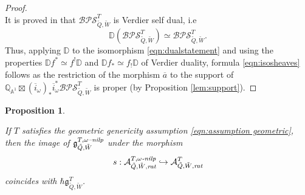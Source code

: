 \documentclass{amsart}
\newtheorem{proposition}[theorem]{Proposition}
\def\oi{\overline{i}}
\def\tQ{\tilde{Q}}
\def\tW{\tilde{W}}
\def\khrate{\mathcal{A}^{T}_{\tQ,\tW,\emph{rat}}}
\def\kharate{\mathcal{A}^{T,\omega\emph{-nilp}}_{\tQ,\tW,\emph{rat}}}
\def\tbps{\mathfrak{g}^T_{\tilde{Q},\tilde{W}}}
\begin{document}
\begin{proof}
\begin{equation}
\end{equation}
It is proved in \cite[Theorem A] {davison2020cohomological} that $\mathcal{BPS}^T_{\tilde{Q},\tilde{W}}$ is Verdier self dual, i.e 
$$
\mathbb{D}(\mathcal{BPS}^T_{\tilde{Q},\tilde{W}}) \simeq \mathcal{BPS}^T_{\tilde{Q},\tilde{W}}.
$$
Thus, applying $\mathbb{D}$ to the isomorphism \eqref{eqn:dualstatement} and using the properties $\mathbb{D}f^* \simeq f^! \mathbb{D}$ and $\mathbb{D}f_{*} \simeq f_! \mathbb{D}$ of Verdier duality, formula \eqref{eqn:isosheaves} follows as the restriction of the morphism $\overline{a}$ to the support of $\mathbb{Q}_{\mathbb{A}^1} \boxtimes (\oi_{\omega})_{*}\oi_{\omega}^*\mathcal{BPS}^T_{\tilde{Q},\tilde{W}}$ is proper (by Proposition \ref{lem:support}). \end{proof}

\medskip

\begin{proposition}
\label{prop:bps}

If $T$ satisfies the geometric genericity assumption \eqref{eqn:assumption geometric}, then the image of $\mathfrak{g}^{T, \omega\emph{--nilp}}_{\tilde{Q},\tilde{W}}$ under the morphism
\[ s: \kharate \hookrightarrow \khrate \] coincides with $\hbar \tbps$. 
\end{proposition}

\medskip 
\end{document}
